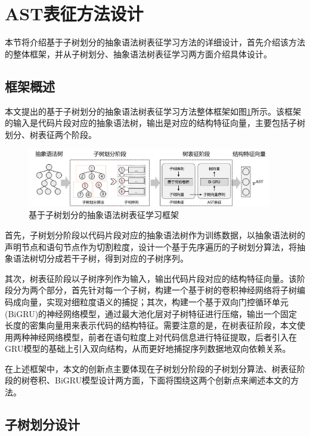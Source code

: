\section{AST表征方法设计}
\label{sec:AST}
本节将介绍基于子树划分的抽象语法树表征学习方法的详细设计，首先介绍该方法的整体框架，并从子树划分、抽象语法树表征学习两方面介绍具体设计。 

\subsection{框架概述}
\label{subsec:ASTOverview}
本文提出的基于子树划分的抽象语法树表征学习方法整体框架如图\ref{fig:astframework}所示。该框架的输入是代码片段对应的抽象语法树，输出是对应的结构特征向量，主要包括子树划分、树表征两个阶段。

\begin{figure}[H]
  \centering
  \includegraphics[width=0.95\textwidth]{figures/astframework.png}
  \caption{基于子树划分的抽象语法树表征学习框架}\label{fig:astframework}
\end{figure}

首先，子树划分阶段以代码片段对应的抽象语法树作为训练数据，以抽象语法树的声明节点和语句节点作为切割粒度，设计一个基于先序遍历的子树划分算法，将抽象语法树切分成若干子树，得到对应的子树序列。

其次，树表征阶段以子树序列作为输入，输出代码片段对应的结构特征向量。该阶段分为两个部分，首先针对每一个子树，构建一个基于树的卷积神经网络将子树编码成向量，实现对细粒度语义的捕捉；其次，构建一个基于双向门控循环单元(BiGRU)的神经网络模型，通过最大池化层对子树特征进行压缩，输出一个固定长度的密集向量用来表示代码的结构特征。需要注意的是，在树表征阶段，本文使用两种神经网络模型，前者在语句粒度上对代码信息进行特征提取，后者引入在GRU模型的基础上引入双向结构，从而更好地捕捉序列数据地双向依赖关系。

在上述框架中，本文的创新点主要体现在子树划分阶段的子树划分算法、树表征阶段的树卷积、BiGRU模型设计两方面，下面将围绕这两个创新点来阐述本文的方法。

\subsection{子树划分设计}
\label{subsec:ASTPreModel}

